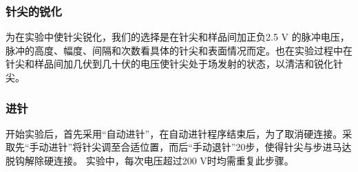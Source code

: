 \documentclass[aps,pre,12pt,preprint,onecolumn,showpacs,showkeys]{revtex4-1}
\begin{document}
\subsubsection{针尖的锐化}
为在实验中使针尖锐化，我们的选择是在针尖和样品间加正负2.5 V 的脉冲电压，脉冲的高度、幅度、间隔和次数看具体的针尖和表面情况而定。也在实验过程中在针尖和样品间加几伏到几十伏的电压使针尖处于场发射的状态，以清洁和锐化针尖。\par
\subsubsection{进针}
开始实验后，首先采用“自动进针”，在自动进针程序结束后，为了取消硬连接。采取先“手动进针”将针尖调至合适位置，而后“手动退针”20步，使得针尖与步进马达脱钩解除硬连接。
实验中，每次电压超过200 V时均需重复此步骤。
\end{document}
